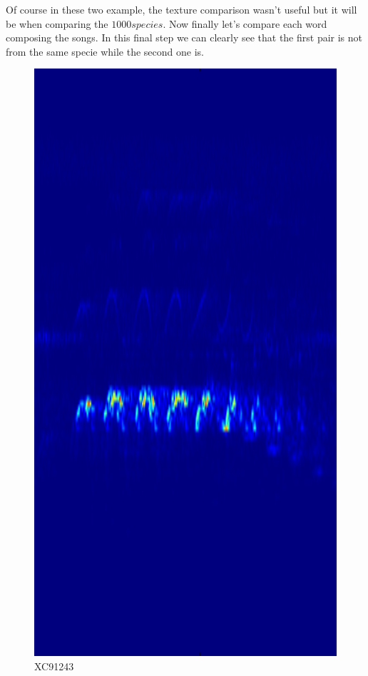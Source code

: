 \documentclass[a4paper]{article}
\begin{document}
Of course in these two example, the texture comparison wasn't useful but it will be when comparing the $1000 species$.
Now finally let's compare each word composing the songs.
In this final step we can clearly see that the first pair is not from the same specie while the second one is.

\begin{figure}[H]
\begin{center}
\includegraphics[scale=0.2]{XC91243_feature.png}\caption{XC91243}\label{figure7}
\end{center}
\end{figure}
\end{document}
